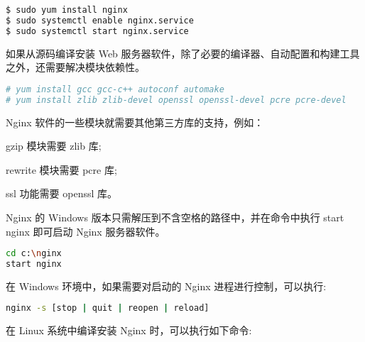 \begin{lstlisting}[language=bash]
$ sudo yum install nginx
$ sudo systemctl enable nginx.service
$ sudo systemctl start nginx.service
\end{lstlisting}

如果从源码编译安装 Web 服务器软件，除了必要的编译器、自动配置和构建工具之外，还需要解决模块依赖性。


\begin{lstlisting}[language=bash]
# yum install gcc gcc-c++ autoconf automake
# yum install zlib zlib-devel openssl openssl-devel pcre pcre-devel
\end{lstlisting}

Nginx 软件的一些模块就需要其他第三方库的支持，例如：

\begin{compactitem}
\item gzip 模块需要 zlib 库;
\item rewrite 模块需要 pcre 库;
\item ssl 功能需要 openssl 库。
\end{compactitem}

Nginx 的 Windows 版本只需解压到不含空格的路径中，并在命令中执行 start nginx 即可启动 Nginx 服务器软件。


\begin{lstlisting}[language=bash]
cd c:\nginx
start nginx
\end{lstlisting}


在 Windows 环境中，如果需要对启动的 Nginx 进程进行控制，可以执行:

\begin{lstlisting}[language=bash]
nginx -s [stop | quit | reopen | reload]
\end{lstlisting}


在 Linux 系统中编译安装 Nginx 时，可以执行如下命令:

